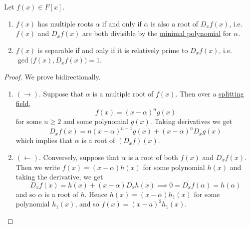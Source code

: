   \begin{theorem}
    \label{thm:conditions-for-separability}
    Let $f(x) \in F[x]$. 
    \begin{enumerate}
      \item $f(x)$ has multiple roots $\alpha$ if and only if $\alpha$ is also a root of $D_x f(x)$, i.e. $f(x)$ and $D_x f(x)$ are both divisible by the \hyperref[def:min_poly]{minimal polynomial} for $\alpha$. 
      \item $f(x)$ is separable if and only if it is relatively prime to $D_x f(x)$, i.e. $\gcd\big( f(x), D_x f(x) \big) = 1$. 
    \end{enumerate}
  \end{theorem}
  \begin{proof}
    We prove bidirectionally. 
    \begin{enumerate}
      \item $(\rightarrow)$. Suppose that $\alpha$ is a multiple root of $f(x)$. Then over a \hyperref[def:splitting-field]{splitting field}, 
      \begin{equation}
        f(x) = (x - \alpha)^n g(x)
      \end{equation}
      for some $n \geq 2$ and some polynomial $g(x)$. Taking derivatives we get 
      \begin{equation}
        D_x f(x) = n (x - \alpha)^{n-1} g(x) + (x - \alpha)^n D_x g(x) 
      \end{equation}
      which implies that $\alpha$ is a root of $(D_x f)(x)$. 

      \item $(\leftarrow)$. Conversely, suppose that $\alpha$ is a root of both $f(x)$ and $D_x f(x)$. Then we write $f(x) = (x - \alpha) h(x)$ for some polynomial $h(x)$ and taking the derivative, we get 
        \begin{equation}
          D_x f(x) = h(x) + (x - \alpha) D_x h(x) \implies 0 = D_x f(\alpha) = h(\alpha)
        \end{equation} 
        and so $\alpha$ is a root of $h$. Hence $h(x) = (x - \alpha) h_1 (x)$ for some polynomial $h_1 (x)$, and so $f(x) = (x - a)^2 h_1 (x)$. 
    \end{enumerate}
  \end{proof}

